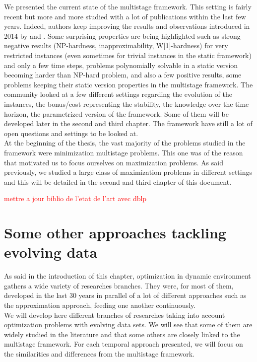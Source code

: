 \documentclass[a4paper]{book}
\newcommand{\alex}[2]{\textcolor{red}{#1}}
\begin{document}
We presented the current state of the multistage framework. This setting is fairly recent but more and more studied with a lot of publications within the last few years. Indeed, authors keep improving the results and observations introduced in 2014 by \cite{Gupta} and \cite{Eisenstat}. Some surprising properties are being highlighted such as strong negative results (NP-hardness, inapproximability, W[1]-hardness) for very restricted instances (even sometimes for trivial instances in the static framework) and only a few time steps, problems polynomially solvable in a static version becoming harder than NP-hard problem, and also a few positive results, some problems keeping their static version properties in the multistage framework. The community looked at a few different settings regarding the evolution of the instances, the bonus/cost representing the stability, the knowledge over the time horizon, the parametrized version of the framework. Some of them will be developed later in the second and third chapter. The framework have still a lot of open questions and settings to be looked at. \\
At the beginning of the thesis, the vast majority of the problems studied in the framework were minimization multistage problems. This one was of the reason that motivated us to focus ourselves on maximization problems. As said previously, we studied a large class of maximization problems in different settings and this will be detailed in the second and third chapter of this document.


\alex{mettre a jour biblio de l'etat de l'art avec dblp}\\
\section{Some other approaches tackling evolving data} \label{tempsota}

As said in the introduction of this chapter, optimization in dynamic environment gathers a wide variety of researches branches. They were, for most of them, developed in the last 30 years in parallel of a lot of different approaches such as the approximation approach, feeding one another continuously.\\
We will develop here different branches of researches taking into account optimization problems with evolving data sets. We will see that some of them are widely studied in the literature and that some others are closely linked to the multistage framework. For each temporal approach presented, we will focus on the similarities and differences from the multistage framework. \\
\end{document}
